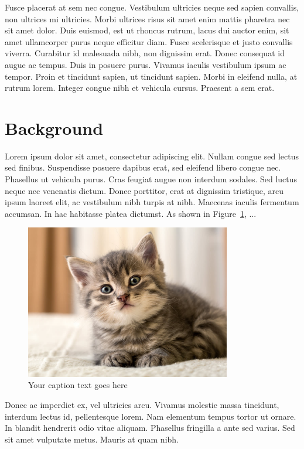 \documentclass{utitcphd_overleaf}
\begin{document}
Fusce placerat at sem nec congue. Vestibulum ultricies neque sed sapien convallis, non ultrices mi ultricies. Morbi ultrices risus sit amet enim mattis pharetra nec sit amet dolor. Duis euismod, est ut rhoncus rutrum, lacus dui auctor enim, sit amet ullamcorper purus neque efficitur diam. Fusce scelerisque et justo convallis viverra. Curabitur id malesuada nibh, non dignissim erat. Donec consequat id augue ac tempus. Duis in posuere purus. Vivamus iaculis vestibulum ipsum ac tempor. Proin et tincidunt sapien, ut tincidunt sapien. Morbi in eleifend nulla, at rutrum lorem. Integer congue nibh et vehicula cursus. Praesent a sem erat.

\section{Background}

Lorem ipsum dolor sit amet, consectetur adipiscing elit. Nullam congue sed lectus sed finibus. Suspendisse posuere dapibus erat, sed eleifend libero congue nec. Phasellus ut vehicula purus. Cras feugiat augue non interdum sodales. Sed luctus neque nec venenatis dictum. Donec porttitor, erat at dignissim tristique, arcu ipsum laoreet elit, ac vestibulum nibh turpis at nibh. Maecenas iaculis fermentum accumsan. In hac habitasse platea dictumst. As shown in Figure~\ref{fig:yourlabel}, ...

\begin{figure}[ht]
  \centering
  \includegraphics[width=0.8\textwidth]{my_images/kitten.jpeg}
  \caption{Your caption text goes here}
  \label{fig:yourlabel}
\end{figure}


Donec ac imperdiet ex, vel ultricies arcu. Vivamus molestie massa tincidunt, interdum lectus id, pellentesque lorem. Nam elementum tempus tortor ut ornare. In blandit hendrerit odio vitae aliquam. Phasellus fringilla a ante sed varius. Sed sit amet vulputate metus. Mauris at quam nibh.
\end{document}
